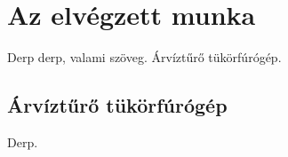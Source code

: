 \chapter{Az elvégzett munka}
Derp derp, valami szöveg. Árvíztűrő tükörfúrógép.


\section{Árvíztűrő tükörfúrógép}
Derp.



